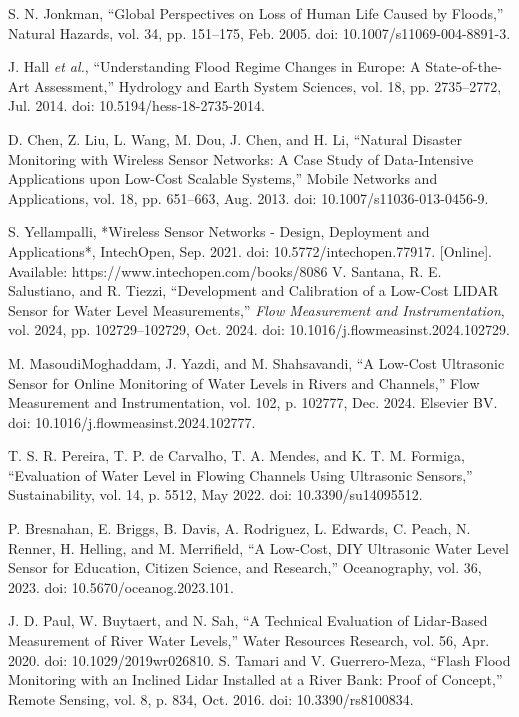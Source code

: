 \documentclass[conference]{IEEEtran}
\begin{document}
\begin{thebibliography}{00}
 S. N. Jonkman, 
``Global Perspectives on Loss of Human Life Caused by Floods,'' 
Natural Hazards, vol. 34, pp. 151--175, Feb. 2005. doi: 10.1007/s11069-004-8891-3.

 J. Hall \textit{et al.}, 
``Understanding Flood Regime Changes in Europe: A State-of-the-Art Assessment,'' 
Hydrology and Earth System Sciences, vol. 18, pp. 2735--2772, Jul. 2014. doi: 10.5194/hess-18-2735-2014.

 D. Chen, Z. Liu, L. Wang, M. Dou, J. Chen, and H. Li, 
``Natural Disaster Monitoring with Wireless Sensor Networks: A Case Study of Data-Intensive Applications upon Low-Cost Scalable Systems,'' 
Mobile Networks and Applications, vol. 18, pp. 651--663, Aug. 2013. doi: 10.1007/s11036-013-0456-9.

 S. Yellampalli, 
*Wireless Sensor Networks - Design, Deployment and Applications*, IntechOpen, Sep. 2021. doi: 10.5772/intechopen.77917. [Online]. Available: https://www.intechopen.com/books/8086
 V. Santana, R. E. Salustiano, and R. Tiezzi, ``Development and Calibration of a Low-Cost LIDAR Sensor for Water Level Measurements,'' \emph{Flow Measurement and Instrumentation}, vol. 2024, pp. 102729--102729, Oct. 2024. doi: 10.1016/j.flowmeasinst.2024.102729.

 M. MasoudiMoghaddam, J. Yazdi, and M. Shahsavandi, 
``A Low-Cost Ultrasonic Sensor for Online Monitoring of Water Levels in Rivers and Channels,'' 
Flow Measurement and Instrumentation, vol. 102, p. 102777, Dec. 2024. Elsevier BV. doi: 10.1016/j.flowmeasinst.2024.102777.

 T. S. R. Pereira, T. P. de Carvalho, T. A. Mendes, and K. T. M. Formiga, 
``Evaluation of Water Level in Flowing Channels Using Ultrasonic Sensors,'' 
Sustainability, vol. 14, p. 5512, May 2022. doi: 10.3390/su14095512.

 P. Bresnahan, E. Briggs, B. Davis, A. Rodriguez, L. Edwards, C. Peach, N. Renner, H. Helling, and M. Merrifield, 
``A Low-Cost, DIY Ultrasonic Water Level Sensor for Education, Citizen Science, and Research,'' 
Oceanography, vol. 36, 2023. doi: 10.5670/oceanog.2023.101.


 J. D. Paul, W. Buytaert, and N. Sah, 
``A Technical Evaluation of Lidar-Based Measurement of River Water Levels,'' 
Water Resources Research, vol. 56, Apr. 2020. doi: 10.1029/2019wr026810.
 S. Tamari and V. Guerrero-Meza, 
``Flash Flood Monitoring with an Inclined Lidar Installed at a River Bank: Proof of Concept,'' 
Remote Sensing, vol. 8, p. 834, Oct. 2016. doi: 10.3390/rs8100834.


\end{thebibliography}
\end{document}
